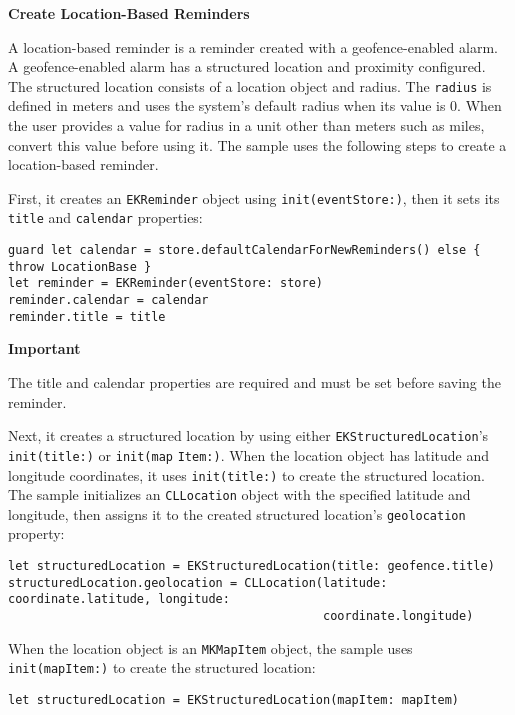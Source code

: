 \documentclass{article}
\begin{document}
\textbf{Create Location-Based Reminders}

A location-based reminder is a reminder created with a geofence-enabled alarm. A geofence-enabled alarm has a
structured location and proximity configured. The structured location consists of a location object and radius. The
\texttt{radius} is defined in meters and uses the system's default radius when its value is 0. When the user provides a
value for radius in a unit other than meters such as miles, convert this value before using it. The sample uses
the following steps to create a location-based reminder.

First, it creates an \texttt{EKReminder} object using \texttt{init(eventStore:)}, then it sets its \texttt{title} and \texttt{calendar}
properties:

\begin{verbatim}
guard let calendar = store.defaultCalendarForNewReminders() else { throw LocationBase }
let reminder = EKReminder(eventStore: store)
reminder.calendar = calendar
reminder.title = title
\end{verbatim}

\textbf{Important}

The title and calendar properties are required and must be set before saving the reminder.

Next, it creates a structured location by using either \texttt{EKStructuredLocation}'s \texttt{init(title:)} or \texttt{init(map}
\texttt{Item:)}. When the location object has latitude and longitude coordinates, it uses \texttt{init(title:)} to create the
structured location. The sample initializes an \texttt{CLLocation} object with the specified latitude and longitude, then
assigns it to the created structured location's \texttt{geolocation} property:

\begin{verbatim}
let structuredLocation = EKStructuredLocation(title: geofence.title)
structuredLocation.geolocation = CLLocation(latitude: coordinate.latitude, longitude:
                                            coordinate.longitude)
\end{verbatim}

When the location object is an \texttt{MKMapItem} object, the sample uses \texttt{init(mapItem:)} to create the structured
location:

\begin{verbatim}
let structuredLocation = EKStructuredLocation(mapItem: mapItem)
\end{verbatim}
\end{document}
